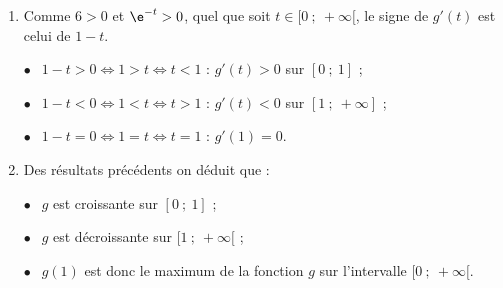 \medskip

\begin{enumerate}
\item Comme $6 > 0$ et $\e^{-t} > 0$, quel que soit $t \in [0~;~+ \infty[$, le signe de $g'(t)$ est celui de $1 - t$.

$\bullet~~$ $1 - t > 0 \iff 1 > t \iff t < 1$ : $g'(t) > 0$ sur $[0~;~1]$ ;

$\bullet~~$ $1 - t < 0 \iff 1 < t \iff t > 1$ : $g'(t) < 0$ sur $[1~;~+ \infty]$ ;

$\bullet~~$ $1 - t = 0 \iff 1 = t \iff t = 1$ : $g'(1) = 0$.

\item Des résultats précédents on déduit que :

$\bullet~~$ $g$ est croissante sur $[0~;~1]$ ;

$\bullet~~$ $g$ est décroissante sur $[1~;~+ \infty[$ ;

$\bullet~~$ $g(1)$ est donc le maximum de la fonction $g$ sur l'intervalle $[0~;~+ \infty[$.
\end{enumerate}

\bigskip
